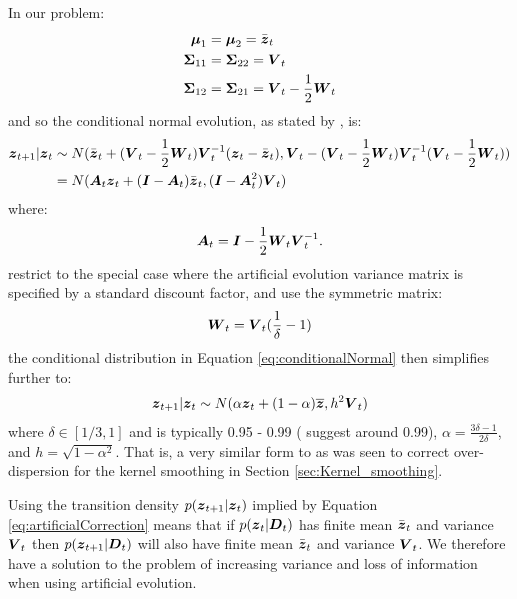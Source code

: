 In our problem: 
\begin{align} 
\boldsymbol{\mu}_1 &= \boldsymbol{\mu}_2 = \bar{\boldsymbol{z}}_t \notag\\
\boldsymbol{\Sigma}_{11} &= \boldsymbol{\Sigma}_{22} = \boldsymbol{V}_t \notag \\
\boldsymbol{\Sigma}_{12} &= \boldsymbol{\Sigma}_{21} = \boldsymbol{V}_t -\frac{1}{2} \boldsymbol{W}_t \notag
\end{align}
and so the conditional normal evolution, as stated by \cite{liu2001}, is:
\begin{align} 
\boldsymbol{z}_{t+1} | \boldsymbol{z}_t 
&\sim N(\bar{\boldsymbol{z}}_t + (\boldsymbol{V}_t -\frac{1}{2} \boldsymbol{W}_t) \boldsymbol{V}_t^{-1} (\boldsymbol{z}_t - \bar{\boldsymbol{z}}_t), 
\boldsymbol{V}_t - (\boldsymbol{V}_t -\frac{1}{2} \boldsymbol{W}_t) \boldsymbol{V}_t^{-1} (\boldsymbol{V}_t -\frac{1}{2} \boldsymbol{W}_t)) \notag \\
&= N(\boldsymbol{A}_t \boldsymbol{z}_t + (\boldsymbol{I} - \boldsymbol{A}_t) \bar{\boldsymbol{z}}_t, 
(\boldsymbol{I} - \boldsymbol{A}_t^2) \boldsymbol{V}_t)
\label{eq:conditionalNormal}
\end{align}
where:
\begin{align} 
\boldsymbol{A}_t = \boldsymbol{I} - \frac{1}{2} \boldsymbol{W}_t \boldsymbol{V}_t^{-1}.
\end{align}
\cite{liu2001} restrict to the special case where the artificial evolution variance matrix is specified by a standard
discount factor, and use the symmetric matrix:
\begin{align}
\boldsymbol{W}_t = \boldsymbol{V}_t (\frac{1}{\delta} - 1)
\end{align}
the conditional distribution in Equation \eqref{eq:conditionalNormal} then simplifies further to:
\begin{align}
\boldsymbol{z}_{t+1} | \boldsymbol{z}_t \sim N(\alpha \boldsymbol{z}_t + (1 - \alpha) \overline{\boldsymbol{z}}, h^2 \boldsymbol{V}_t)
\label{eq:artificialCorrection}
\end{align}
where \(\delta \in [1/3, 1]\) and is typically 0.95 - 0.99 (\cite{liu2001} suggest around 0.99), \(\alpha =
\frac{3\delta - 1}{2\delta}\), and \(h = \sqrt{1 - \alpha^2}\). That is, a very similar form to as was seen to correct
over-dispersion for the kernel smoothing in Section \ref{sec:Kernel_smoothing}. 

Using the transition density \(p(\boldsymbol{z}_{t+1} | \boldsymbol{z}_t)\) implied by Equation \eqref{eq:artificialCorrection} means
that if \(p(\boldsymbol{z}_t | \boldsymbol{D}_t)\) has finite mean \(\bar{\boldsymbol{z}}_t\) and variance \(\boldsymbol{V}_t\) then \(p(\boldsymbol{z}_{t+1} |
\boldsymbol{D}_t)\) will also have finite mean \(\bar{\boldsymbol{z}}_t\) and variance \(\boldsymbol{V}_t\). We therefore have a solution to the
problem of increasing variance and loss of information when using artificial evolution.

